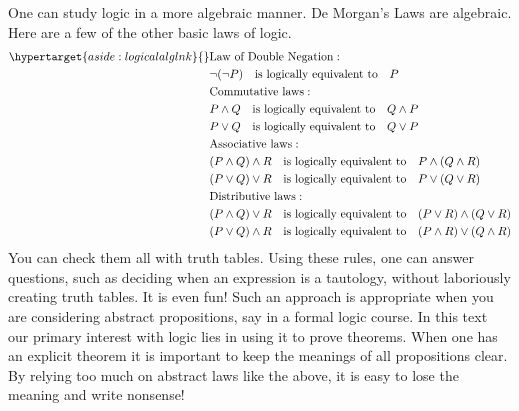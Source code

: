 \begin{aside}

One can study logic in a more algebraic manner. De Morgan's Laws are algebraic. Here are a few of the other basic laws of logic.
\begin{align*}\label{aside:logicalalg}\hypertarget{aside:logicalalglnk}{}
&\text{Law of Double Negation}: \\
&\neg(\neg P) \quad \text{is logically equivalent to} \quad P \\
&\text{Commutative laws}: \\
&P\wedge Q \quad \text{is logically equivalent to} \quad Q\wedge P \\
&P\vee Q \quad \text{is logically equivalent to} \quad Q\vee P\\
&\text{Associative laws}: \\
&(P\wedge Q)\wedge R \quad \text{is logically equivalent to} \quad P\wedge(Q\wedge R) \\
&(P\vee Q)\vee R \quad \text{is logically equivalent to} \quad P\vee(Q\vee R)\\
&\text{Distributive laws}: \\
&(P\wedge Q)\vee R \quad \text{is logically equivalent to} \quad (P\vee R)\wedge (Q\vee R) \\
&(P\vee Q)\wedge R \quad \text{is logically equivalent to} \quad (P\wedge R)\vee (Q\wedge R)
\end{align*}
You can check them all with truth tables. Using these rules, one can answer questions, such as deciding when an expression is a tautology, without laboriously creating truth tables. It is even fun! Such an approach is appropriate when you are  considering abstract propositions, say in a formal logic course. In this text our primary interest with logic lies in using it to prove theorems. When one has an explicit theorem it is important to keep the meanings of all propositions clear. By relying too much on abstract laws like the above, it is easy to lose the meaning and write nonsense! 
\end{aside}





